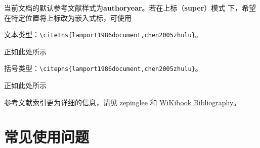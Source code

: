当前文档的默认参考文献样式为\textbf{authoryear}。若在上标（\textbf{super}）模式
下，希望在特定位置将上标改为嵌入式标，可使用

文本类型：\verb|\citetns{lamport1986document,chen2005zhulu}|。

正如此处所示

括号类型：\verb|\citepns{lamport1986document,chen2005zhulu}|。

正如此处所示

参考文献索引更为详细的信息，请见
\href{https://github.com/zepinglee/gbt7714-bibtex-style}{zepinglee} 和
\href{https://en.wikibooks.org/wiki/LaTeX/Bibliography_Management}{WiKibook
Bibliography}。

\nocite{*}

\section{常见使用问题}\label{sec:qa}

